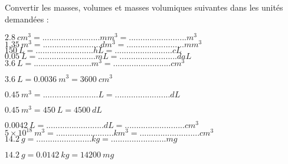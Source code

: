 
Convertir les masses, volumes et masses volumiques suivantes dans les unités demandées :\\
\begin{questions}
	
		\question $ \num{2.8}\ cm^3 =  ......................... mm^3 = ......................... m^3 $\\
		
		\question $ \num{1.35}\ m^3 =  ......................... dm^3 = ......................... mm^3 $\\
		
		\question $ \num{150}\ L =  .........................  hL = ......................... cL $\\
		
		\question $ \num{0.05}\ L =  .........................  mL = ......................... daL $\\
			
		\question $ \num{3.6}\  L =  ......................... m^3 = .........................cm^3 $\\
		\begin{solution}
			$ \num{3.6}\  L =  \num{0.0036}\  m^3 = \num{3600}\  cm^3 $
		\end{solution}
		
		\question $ \num{0.45}\  m^3 =........................L =........................dL  $\\
		\begin{solution}
			$ \num{0.45}\  m^3 = \num{450}\  L = \num{4500}\  dL $
		\end{solution}
		
		\question $ \num{0.0042}\  L =  ......................... dL = ..........................cm^3 $\\
		
		
		\question $ 5 \times 10^{18}\  m^3 =  ......................... km^3 = ..........................cm^3 $\\
		
		
		\question $\num{14.2}\  g =........................kg =........................mg $\\
		\begin{solution}
			$ \num{14.2}\  g = \num{0.0142}\  kg = \num{14200}\  mg $
		\end{solution}
		

\end{questions}
